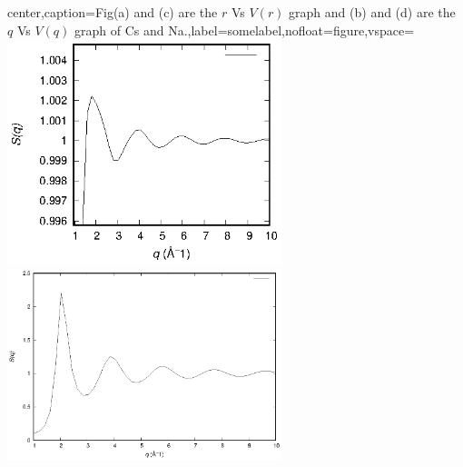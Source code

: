 \documentclass[final,12pt]{elsarticle}
\begin{document}
{\begin{adjustbox}{center,caption={Fig(a) and (c) are the $r$ Vs $V(r)$ graph and (b) and (d) are the $q$ Vs $V(q)$ graph  of Cs and Na.},label={somelabel},nofloat=figure,vspace=\bigskipamount}
	\includegraphics[width=0.6\textwidth]{vCsS(q).eps}
	\includegraphics[width=0.6\textwidth]{vNaS(q).eps}
\end{adjustbox}

}
\end{document}
